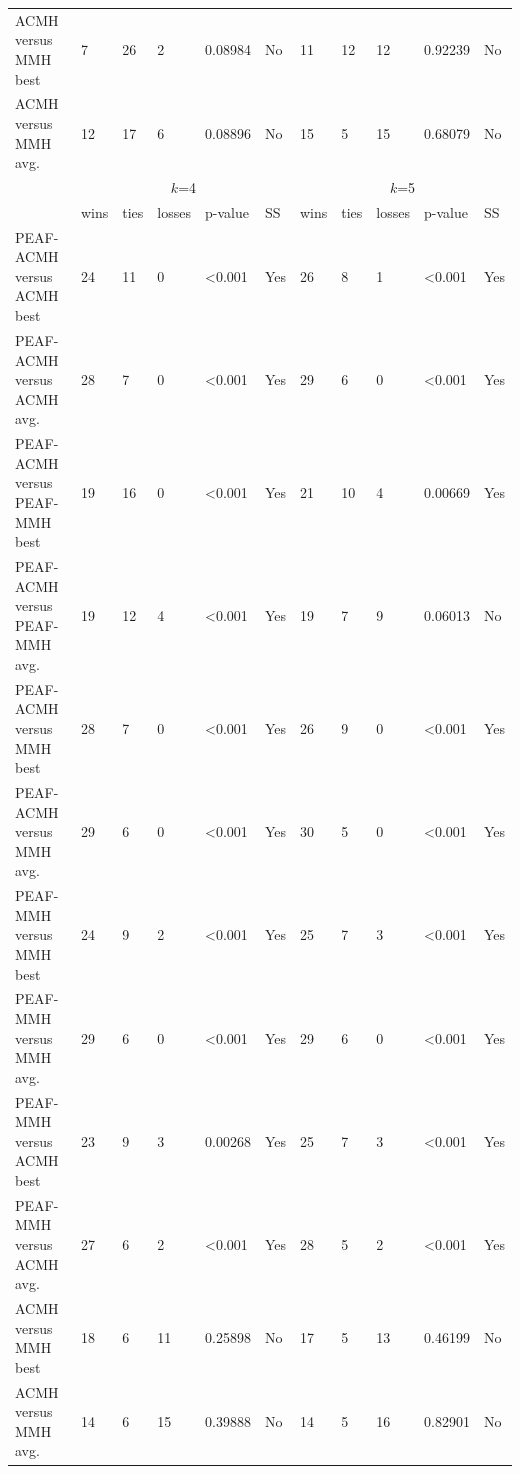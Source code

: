 \documentclass[12pt, a4paper]{article}%
\numberwithin{equation}{section}
\theoremstyle{plain}
\begin{document}
{\begin{landscape}
\begin{longtable}{|l|lllll|lllll|}
						ACMH versus MMH best                   & 7    & 26   & 2      & 0.08984          & No  & 11   & 12   & 12     & 0.92239          & No  \\
						ACMH versus MMH avg.                   & 12   & 17   & 6      & 0.08896          & No  & 15   & 5    & 15     & 0.68079          & No  \\ \hline
						\multicolumn{1}{|c|}{\multirow{2}{*}{}} & \multicolumn{5}{c|}{$k$=4}                    & \multicolumn{5}{c|}{$k$=5}                    \\ \cline{2-11} 
						\multicolumn{1}{|c|}{}                  & wins & ties & losses & p-value          & SS  & wins & ties & losses & p-value          & SS  \\ \hline
						PEAF-ACMH versus ACMH best             & 24   & 11   & 0      & \textless{}0.001 & Yes & 26   & 8    & 1      & \textless{}0.001 & Yes \\
						PEAF-ACMH versus ACMH avg.             & 28   & 7    & 0      & \textless{}0.001 & Yes & 29   & 6    & 0      & \textless{}0.001 & Yes \\
						PEAF-ACMH versus PEAF-MMH best           & 19   & 16   & 0      & \textless{}0.001 & Yes & 21   & 10   & 4      & 0.00669          & Yes \\
						PEAF-ACMH versus PEAF-MMH avg.           & 19   & 12   & 4      & \textless{}0.001 & Yes & 19   & 7    & 9      & 0.06013          & No  \\
						PEAF-ACMH versus MMH best               & 28   & 7    & 0      & \textless{}0.001 & Yes & 26   & 9    & 0      & \textless{}0.001 & Yes \\
						PEAF-ACMH versus MMH avg.               & 29   & 6    & 0      & \textless{}0.001 & Yes & 30   & 5    & 0      & \textless{}0.001 & Yes \\
						PEAF-MMH versus MMH best                 & 24   & 9    & 2      & \textless{}0.001 & Yes & 25   & 7    & 3      & \textless{}0.001 & Yes \\
						PEAF-MMH versus MMH avg.                 & 29   & 6    & 0      & \textless{}0.001 & Yes & 29   & 6    & 0      & \textless{}0.001 & Yes \\
						PEAF-MMH versus ACMH best               & 23   & 9    & 3      & 0.00268          & Yes & 25   & 7    & 3      & \textless{}0.001 & Yes \\
						PEAF-MMH versus ACMH avg.               & 27   & 6    & 2      & \textless{}0.001 & Yes & 28   & 5    & 2      & \textless{}0.001 & Yes \\
						ACMH versus MMH best                   & 18   & 6    & 11     & 0.25898          & No  & 17   & 5    & 13     & 0.46199          & No  \\
						ACMH versus MMH avg.                   & 14   & 6    & 15     & 0.39888          & No  & 14   & 5    & 16     & 0.82901          & No  \\ \hline
					\end{longtable}
				\end{landscape}
			}
			
\end{document}
